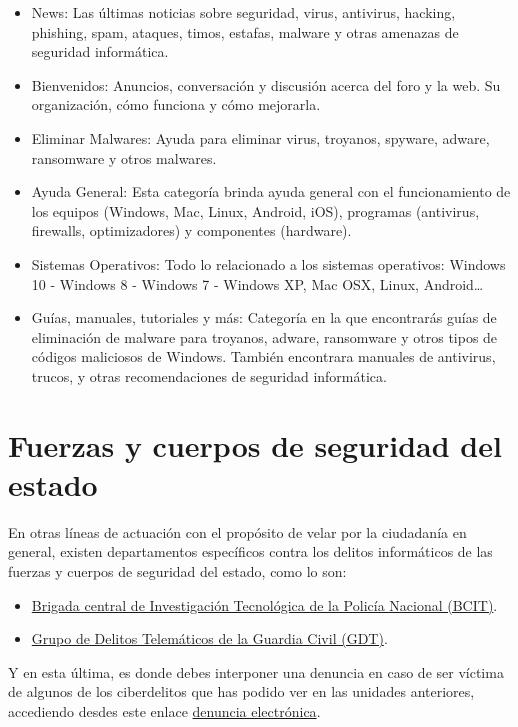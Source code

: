 \documentclass[
  a4paper,
  openany]{book}
\begin{document}
\begin{itemize}
\item
  News: Las últimas noticias sobre seguridad, virus, antivirus, hacking, phishing, spam, ataques, timos, estafas, malware y otras amenazas de seguridad informática.
\item
  Bienvenidos: Anuncios, conversación y discusión acerca del foro y la web. Su organización, cómo funciona y cómo mejorarla.
\item
  Eliminar Malwares: Ayuda para eliminar virus, troyanos, spyware, adware, ransomware y otros malwares.
\item
  Ayuda General: Esta categoría brinda ayuda general con el funcionamiento de los equipos (Windows, Mac, Linux, Android, iOS), programas (antivirus, firewalls, optimizadores) y componentes (hardware).
\item
  Sistemas Operativos: Todo lo relacionado a los sistemas operativos: Windows 10 - Windows 8 - Windows 7 - Windows XP, Mac OSX, Linux, Android\ldots{}
\item
  Guías, manuales, tutoriales y más: Categoría en la que encontrarás guías de eliminación de malware para troyanos, adware, ransomware y otros tipos de códigos maliciosos de Windows. También encontrara manuales de antivirus, trucos, y otras recomendaciones de seguridad informática.
\end{itemize}

\hypertarget{fuerzas-y-cuerpos-de-seguridad-del-estado}{%
\section{Fuerzas y cuerpos de seguridad del estado}\label{fuerzas-y-cuerpos-de-seguridad-del-estado}}

En otras líneas de actuación con el propósito de velar por la ciudadanía en general, existen departamentos específicos contra los delitos informáticos de las fuerzas y cuerpos de seguridad del estado, como lo son:

\begin{itemize}
\item
  \href{https://www.policia.es/_es/tupolicia_conocenos_estructura_dao_cgpoliciajudicial_bcit.php}{Brigada central de Investigación Tecnológica de la Policía Nacional (BCIT)}.
\item
  \href{https://www.gdt.guardiacivil.es/webgdt/home_alerta.php}{Grupo de Delitos Telemáticos de la Guardia Civil (GDT)}.
\end{itemize}

Y en esta última, es donde debes interponer una denuncia en caso de ser víctima de algunos de los ciberdelitos que has podido ver en las unidades anteriores, accediendo desdes este enlace \href{https://www.guardiacivil.es/es/servicios/denuncias/denuncia_electronica/index.html}{denuncia electrónica}.

  
\end{document}
